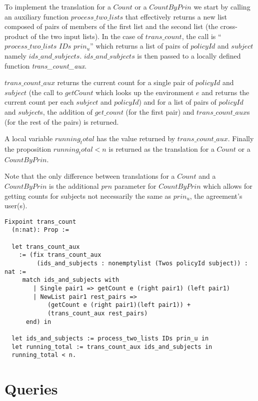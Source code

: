 To implement the translation for a $Count$ or a $CountByPrin$ we start by calling an auxiliary function $process\_two\_lists$ that effectively returns a new list composed of pairs of members of the first list and the second list (the cross-product of the two input lists). In the case of $trans\_count$, the call is ``$process\_two\_lists$ $IDs$ $prin_u$'' which returns a list of pairs of $policyId$ and $subject$ namely $ids\_and\_subjects$. $ids\_and\_subjects$ is then passed to a locally defined function \emph{trans_count_aux}.

$trans\_count\_aux$ returns the current count for a single pair of $policyId$ and $subject$ (the call to $getCount$ which looks up the environment $e$ and returns the current count per each $subject$ and $policyId$) and for a list of pairs of $policyId$ and $subject$s, the addition of $get\_count$ (for the first pair) and $trans\_count\_aux$s (for the rest of the pairs) is returned. 

A local variable $running_total$ has the value returned by $trans\_count\_aux$. Finally the proposition $running_total < n$ is returned as the translation for a $Count$ or a $CountByPrin$.

Note that the only difference between translations for a $Count$ and a $CountByPrin$ is the additional $prn$ parameter for $CountByPrin$ which allows for getting counts for subjects not necessarily the same as $prin_{u}$, the agreement's user(s).


\begin{minipage}[c]{0.95\textwidth}
\begin{lstlisting}
Fixpoint trans_count 
  (n:nat): Prop := 

  let trans_count_aux 
    := (fix trans_count_aux
         (ids_and_subjects : nonemptylist (Twos policyId subject)) : nat :=
     match ids_and_subjects with
        | Single pair1 => getCount e (right pair1) (left pair1)
        | NewList pair1 rest_pairs =>
            (getCount e (right pair1)(left pair1)) +
            (trans_count_aux rest_pairs)
      end) in
  
  let ids_and_subjects := process_two_lists IDs prin_u in
  let running_total := trans_count_aux ids_and_subjects in
  running_total < n.
\end{lstlisting}
\end{minipage}

\section{Queries}

